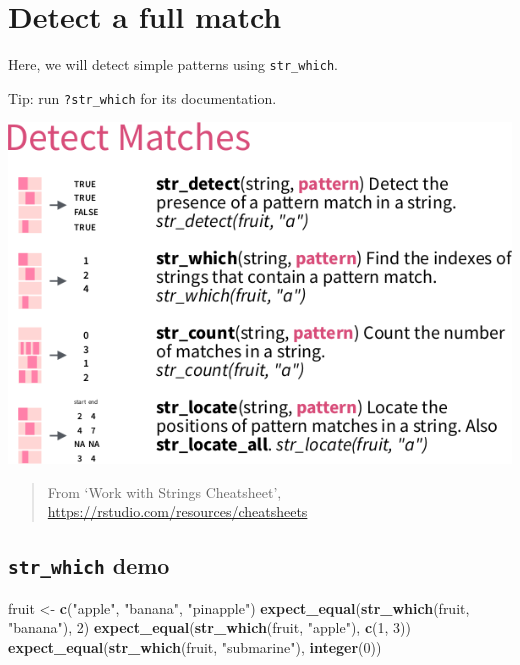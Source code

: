 \documentclass[]{book}
\newenvironment{Shaded}{}{}
\newcommand{\DecValTok}[1]{\textcolor[rgb]{0.25,0.63,0.44}{#1}}
\newcommand{\KeywordTok}[1]{\textcolor[rgb]{0.00,0.44,0.13}{\textbf{#1}}}
\newcommand{\NormalTok}[1]{#1}
\newcommand{\StringTok}[1]{\textcolor[rgb]{0.25,0.44,0.63}{#1}}
\begin{document}
\hypertarget{detect-a-full-match}{%
\section{Detect a full match}\label{detect-a-full-match}}

Here, we will detect simple patterns using \texttt{str\_which}.

Tip: run \texttt{?str\_which} for its documentation.

\includegraphics{data/06_detect.png}

\begin{quote}
From `Work with Strings Cheatsheet', \url{https://rstudio.com/resources/cheatsheets}
\end{quote}

\hypertarget{str_which-demo}{%
\subsection{\texorpdfstring{\texttt{str\_which} demo}{str\_which demo}}\label{str_which-demo}}

\begin{Shaded}
\begin{Highlighting}[]
\NormalTok{fruit <-}\StringTok{ }\KeywordTok{c}\NormalTok{(}\StringTok{"apple"}\NormalTok{, }\StringTok{"banana"}\NormalTok{, }\StringTok{"pinapple"}\NormalTok{)}
\KeywordTok{expect_equal}\NormalTok{(}\KeywordTok{str_which}\NormalTok{(fruit, }\StringTok{"banana"}\NormalTok{), }\DecValTok{2}\NormalTok{)}
\KeywordTok{expect_equal}\NormalTok{(}\KeywordTok{str_which}\NormalTok{(fruit, }\StringTok{"apple"}\NormalTok{), }\KeywordTok{c}\NormalTok{(}\DecValTok{1}\NormalTok{, }\DecValTok{3}\NormalTok{))}
\KeywordTok{expect_equal}\NormalTok{(}\KeywordTok{str_which}\NormalTok{(fruit, }\StringTok{"submarine"}\NormalTok{), }\KeywordTok{integer}\NormalTok{(}\DecValTok{0}\NormalTok{))}
\end{Highlighting}
\end{Shaded}
\end{document}
